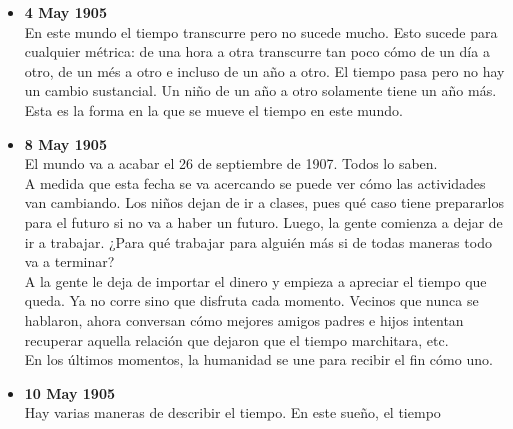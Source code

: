 \documentclass[12pt,a4paper]{report}
\begin{document}
\begin{itemize}
{\begin{itemize}[label=$\bullet$]
{            otro o si es la causa.\\
            Por ejemplo, un país prohibe las armas de fuego y un mes después se
            desata una de las peores olas de crímen en la historia. ¿Esto
            último es el resultado de lo primero o una causa colocada de una
            manera distinta a la que estamos acostumbrados?\\
            Los científicos no tienen prestigio, pues sus predicciónes se han
            vuelto descripciones. \\
            En este mundo, la gente vive sin temer por las consecuencias que sus
            acciones puedan traer en el futuro, pues esas consecuencias ya
            sucedieron.
        }
        \item{\textbf{4 May 1905}\\
            En este mundo el tiempo transcurre pero no sucede mucho. Esto sucede
            para cualquier métrica: de una hora a otra transcurre tan poco cómo
            de un día a otro, de un més a otro e incluso de un año a otro. El
            tiempo pasa pero no hay un cambio sustancial. Un niño de un año a
            otro solamente tiene un año más. Esta es la forma en la que se mueve
            el tiempo en este mundo.
        }
        \item{\textbf{8 May 1905}\\
            El mundo va a acabar el 26 de septiembre de 1907. Todos lo saben.\\
            A medida que esta fecha se va acercando se puede ver cómo las
            actividades van cambiando. Los niños dejan de ir a clases, pues qué
            caso tiene prepararlos para el futuro si no va a haber un futuro.
            Luego, la gente comienza a dejar de ir a trabajar. ¿Para qué
            trabajar para alguién más si de todas maneras todo va a terminar?\\
            A la gente le deja de importar el dinero y empieza a apreciar el
            tiempo que queda. Ya no corre sino que disfruta cada momento.
            Vecinos que nunca se hablaron, ahora conversan cómo mejores amigos
            padres e hijos intentan recuperar aquella relación que dejaron que
            el tiempo marchitara, etc.\\
            En los últimos momentos, la humanidad se une para recibir el fin
            cómo uno.
        }
        \item{\textbf{10 May 1905}\\
            Hay varias maneras de describir el tiempo. En este sueño, el tiempo
}
\end{itemize}}
\end{itemize}
\end{document}
